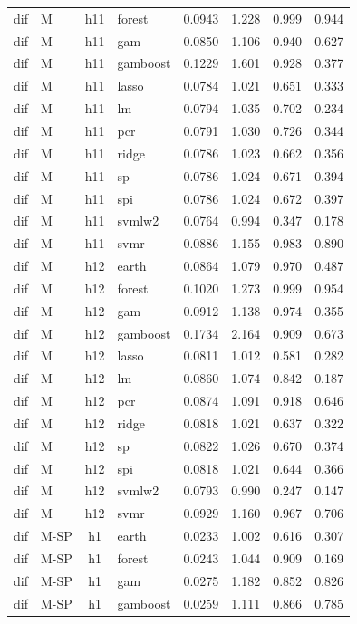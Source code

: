\begin{ThreePartTable}
\begin{longtable}[t]{llclcccc}
dif & M & h11 & forest & 0.0943 & 1.228 & 0.999 & 0.944\\
dif & M & h11 & gam & 0.0850 & 1.106 & 0.940 & 0.627\\
dif & M & h11 & gamboost & 0.1229 & 1.601 & 0.928 & 0.377\\
dif & M & h11 & lasso & 0.0784 & 1.021 & 0.651 & 0.333\\
dif & M & h11 & lm & 0.0794 & 1.035 & 0.702 & 0.234\\
dif & M & h11 & pcr & 0.0791 & 1.030 & 0.726 & 0.344\\
dif & M & h11 & ridge & 0.0786 & 1.023 & 0.662 & 0.356\\
dif & M & h11 & sp & 0.0786 & 1.024 & 0.671 & 0.394\\
dif & M & h11 & spi & 0.0786 & 1.024 & 0.672 & 0.397\\
dif & M & h11 & svmlw2 & 0.0764 & 0.994 & 0.347 & 0.178\\
dif & M & h11 & svmr & 0.0886 & 1.155 & 0.983 & 0.890\\
\addlinespace
dif & M & h12 & earth & 0.0864 & 1.079 & 0.970 & 0.487\\
dif & M & h12 & forest & 0.1020 & 1.273 & 0.999 & 0.954\\
dif & M & h12 & gam & 0.0912 & 1.138 & 0.974 & 0.355\\
dif & M & h12 & gamboost & 0.1734 & 2.164 & 0.909 & 0.673\\
dif & M & h12 & lasso & 0.0811 & 1.012 & 0.581 & 0.282\\
dif & M & h12 & lm & 0.0860 & 1.074 & 0.842 & 0.187\\
dif & M & h12 & pcr & 0.0874 & 1.091 & 0.918 & 0.646\\
dif & M & h12 & ridge & 0.0818 & 1.021 & 0.637 & 0.322\\
dif & M & h12 & sp & 0.0822 & 1.026 & 0.670 & 0.374\\
dif & M & h12 & spi & 0.0818 & 1.021 & 0.644 & 0.366\\
dif & M & h12 & svmlw2 & 0.0793 & 0.990 & 0.247 & 0.147\\
dif & M & h12 & svmr & 0.0929 & 1.160 & 0.967 & 0.706\\
\addlinespace
dif & M-SP & h1 & earth & 0.0233 & 1.002 & 0.616 & 0.307\\
dif & M-SP & h1 & forest & 0.0243 & 1.044 & 0.909 & 0.169\\
dif & M-SP & h1 & gam & 0.0275 & 1.182 & 0.852 & 0.826\\
dif & M-SP & h1 & gamboost & 0.0259 & 1.111 & 0.866 & 0.785\\

\end{longtable}
\end{ThreePartTable}
